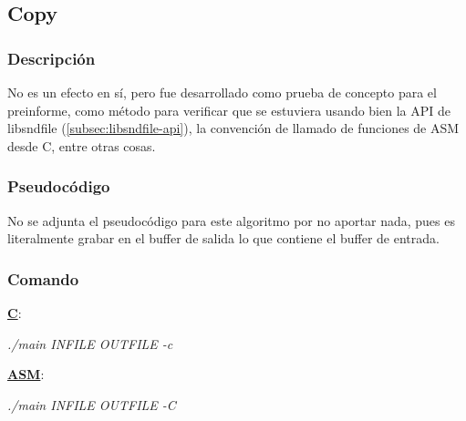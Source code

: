 \subsection{Copy}
\label{subsec:desarrollo-copy}

\subsubsection{Descripción}
\label{subsec:desarrollo-copy-desc}

No es un efecto en sí, pero fue desarrollado como prueba de concepto para el preinforme, como método para verificar que se estuviera usando bien la API de libsndfile (\ref{subsec:libsndfile-api}), la convención de llamado de funciones de ASM desde C, entre otras cosas.

\begin{center}
\end{center}


\subsubsection{Pseudocódigo}
\label{subsec:desarrollo-copy-code}

No se adjunta el pseudocódigo para este algoritmo por no aportar nada, pues es literalmente grabar en el buffer de salida lo que contiene el buffer de entrada.

\subsubsection{Comando}
\label{subsec:desarrollo-copy-call}

\underline{\textbf{C}}:
\begin{center}
 \textit{./main INFILE OUTFILE -c}
\end{center}

\underline{\textbf{ASM}}:
\begin{center}
 \textit{./main INFILE OUTFILE -C}
\end{center}